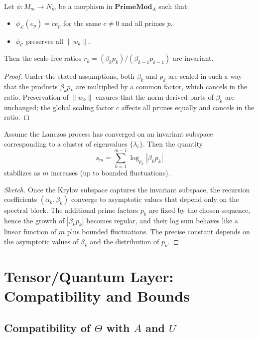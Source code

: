 \documentclass[11pt]{article}
\begin{document}
\begin{proposition}
Let $\phi : M_m\to N_m$ be a morphism in $\mathbf{PrimeMod}_A$
such that:
\begin{itemize}
  \item $\phi_{\mathcal{L}}(e_p) = c e_p$ for the same $c\neq 0$ and
    all primes $p$,
  \item $\phi_{\mathcal{C}}$ preserves all $\|w_k\|$.
\end{itemize}
Then the scale-free ratios
$r_k=(\beta_k p_k)/(\beta_{k-1} p_{k-1})$ are invariant.
\end{proposition}

\begin{proof}
Under the stated assumptions, both $\beta_k$ and $p_k$ are scaled
in such a way that the products $\beta_k p_k$ are multiplied by a
common factor, which cancels in the ratio. Preservation of $\|w_k\|$
ensures that the norm-derived parts of $\beta_k$ are unchanged; the
global scaling factor $c$ affects all primes equally and cancels in
the ratio.\cite{PrimeEigenSolvers}
\end{proof}

\begin{proposition}
Assume the Lanczos process has converged on an invariant subspace
corresponding to a cluster of eigenvalues $\{\lambda_i\}$.
Then the quantity
\[
s_m = \sum_{k=1}^{m-1} \log_{p_k}|\beta_k p_k|
\]
stabilizes as $m$ increases (up to bounded fluctuations).
\end{proposition}

\begin{proof}[Sketch]
Once the Krylov subspace captures the invariant subspace, the recursion
coefficients $(\alpha_k,\beta_k)$ converge to asymptotic values that
depend only on the spectral block.\cite{LanczosAlgo,ConvergenceKrylov}
The additional prime factors $p_k$ are fixed by the chosen sequence,
hence the growth of $|\beta_k p_k|$ becomes regular, and their log
sum behaves like a linear function of $m$ plus bounded fluctuations.
The precise constant depends on the asymptotic values of $\beta_k$ and
the distribution of $p_k$.
\end{proof}

\section{Tensor/Quantum Layer: Compatibility and Bounds}

\subsection{Compatibility of $\Theta$ with $A$ and $U$}
\end{document}
